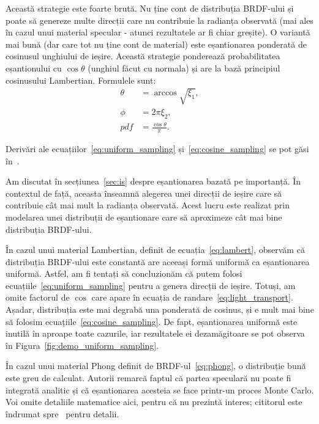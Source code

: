 \documentclass[12pt,a4paper]{report}
\numberwithin{equation}{section} %
\begin{document}
Această strategie este foarte brută. Nu ține cont de distribuția BRDF-ului și
poate să genereze multe direcții care nu contribuie la radianța observată (mai ales
în cazul unui material specular - atunci rezultatele ar fi chiar greșite). O variantă mai bună (dar care tot nu ține cont de material) este eșantionarea ponderată
de cosinusul unghiului de ieșire. Această strategie ponderează probabilitatea
eșantionului cu $\cos \theta$ (unghiul făcut cu normala) și are la bază principiul
cosinusului Lambertian. Formulele sunt:
\begin{equation}\label{eq:cosine_sampling}
	\begin{aligned}
		\theta &= \arccos \sqrt{\xi_1}, \\
		\phi   &= 2\pi \xi_2,	         \\
		pdf    &= \frac{\cos \theta}{\pi}.
	\end{aligned}
\end{equation}

Derivări ale ecuațiilor~\ref{eq:uniform_sampling} și~\ref{eq:cosine_sampling} se pot găsi
în~\cite{sampling}.

Am discutat în secțiunea~\ref{sec:is} despre eșantionarea bazată pe importanță.
În contextul de față, aceasta înseamnă alegerea unei direcții de ieșire care să
contribuie cât mai mult la radianța observată. Acest lucru este realizat prin
modelarea unei distribuții de eșantionare care să aproximeze cât mai bine distribuția
BRDF-ului.

În cazul unui material Lambertian, definit de ecuația~\ref{eq:lambert}, observăm
că distribuția BRDF-ului este constantă are aceeași formă uniformă ca eșantionarea
uniformă. Astfel, am fi tentați să concluzionăm că putem folosi
ecuațiile~\ref{eq:uniform_sampling} pentru a genera direcții de ieșire. Totuși,
am omite factorul de $\cos$ care apare în ecuația de randare~\ref{eq:light_transport}.
Așadar, distribuția este mai degrabă una ponderată de cosinus, și e mult mai bine
să folosim ecuațiile~\ref{eq:cosine_sampling}. De fapt, eșantionarea uniformă este
inutilă în aproape toate cazurile, iar rezultatele ei dezamăgitoare se pot
observa în Figura~\ref{fig:demo_uniform_sampling}.

În cazul unui material Phong definit de BRDF-ul~\ref{eq:phong}, o distribuție
bună este greu de calculat. Autorii remarcă faptul că partea speculară nu poate
fi integrată analitic și că eșantionarea acesteia se face printr-un proces
Monte Carlo. Voi omite detaliile matematice aici, pentru că nu prezintă interes;
cititorul este îndrumat spre~\cite{Lafortune} pentru detalii.
\end{document}
